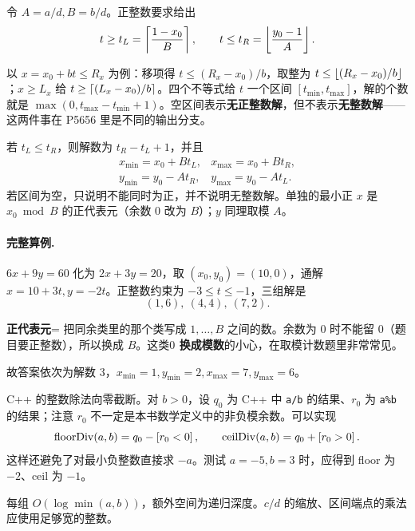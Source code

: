 \sol 令 $A=a/d,B=b/d$。正整数要求给出
\[
 t\ge t_L=\left\lceil \frac{1-x_0}{B}\right\rceil,\qquad
 t\le t_R=\left\lfloor \frac{y_0-1}{A}\right\rfloor.
\]

\begin{tip}
以 $x=x_0+bt\le R_x$ 为例：移项得 $t\le(R_x-x_0)/b$，取整为 $t\le\left\lfloor (R_x-x_0)/b\right\rfloor$；$x\ge L_x$ 给 $t\ge\left\lceil (L_x-x_0)/b\right\rceil$。四个不等式给 $t$ 一个区间 $[t_{\min},t_{\max}]$，解的个数就是 $\max(0,t_{\max}-t_{\min}+1)$。空区间表示\textbf{无正整数解}，但不表示\textbf{无整数解}——这两件事在 P5656 里是不同的输出分支。
\end{tip}

若 $t_L\le t_R$，则解数为 $t_R-t_L+1$，并且
\[
\begin{array}{ll}
x_{\min}=x_0+Bt_L,&x_{\max}=x_0+Bt_R,\\
y_{\min}=y_0-At_R,&y_{\max}=y_0-At_L.
\end{array}
\]
若区间为空，只说明不能同时为正，并不说明无整数解。单独的最小正 $x$ 是 $x_0\bmod B$ 的正代表元（余数 $0$ 改为 $B$）；$y$ 同理取模 $A$。

\paragraph{完整算例.} $6x+9y=60$ 化为 $2x+3y=20$，取 $(x_0,y_0)=(10,0)$，通解 $x=10+3t,y=-2t$。正整数约束为 $-3\le t\le-1$，三组解是
\[
 (1,6),\ (4,4),\ (7,2).
\]

\begin{tip}[词义：正代表元]
\textbf{正代表元}= 把同余类里的那个类写成 $1,\ldots,B$ 之间的数。余数为 $0$ 时不能留 $0$（题目要正整数），所以换成 $B$。这类\textbf{$0$ 换成模数}的小心，在取模计数题里非常常见。
\end{tip}

故答案依次为解数 $3$，$x_{\min}=1,y_{\min}=2,x_{\max}=7,y_{\max}=6$。

\begin{pitfall}[负数整除不等于向下取整]
C++ 的整数除法向零截断。对 $b>0$，设 $q_0$ 为 C++ 中 \texttt{a/b} 的结果、$r_0$ 为 \texttt{a\%b} 的结果；注意 $r_0$ 不一定是本书数学定义中的非负模余数。可以实现
\[
\operatorname{floorDiv}(a,b)=q_0-\left[r_0<0\right],\qquad
\operatorname{ceilDiv}(a,b)=q_0+\left[r_0>0\right].
\]
这样还避免了对最小负整数直接求 $-a$。测试 $a=-5,b=3$ 时，应得到 floor 为 $-2$、ceil 为 $-1$。
\end{pitfall}
\cost 每组 $O(\log\min(a,b))$，额外空间为递归深度。$c/d$ 的缩放、区间端点的乘法应使用足够宽的整数。



